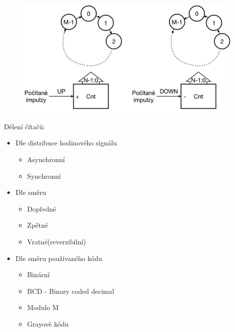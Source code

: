 \begin{figure}[h!]
    \centering
    \includegraphics*[scale = 0.3]{img/citace.png}
\end{figure}
Dělení čítačů:
\begin{itemize}
    \item Dle distribuce hodinového signálu
          \begin{itemize}
              \item Asynchronní
              \item Synchronní
          \end{itemize}
    \item Dle směru
          \begin{itemize}
              \item Dopředné
              \item Zpětné
              \item Vratné(reverzibilní)
          \end{itemize}
    \item Dle směru používaného kódu
          \begin{itemize}
              \item Binární
              \item BCD - Binary coded decimal
              \item Modulo M
              \item Grayově kódu
          \end{itemize}
\end{itemize}
